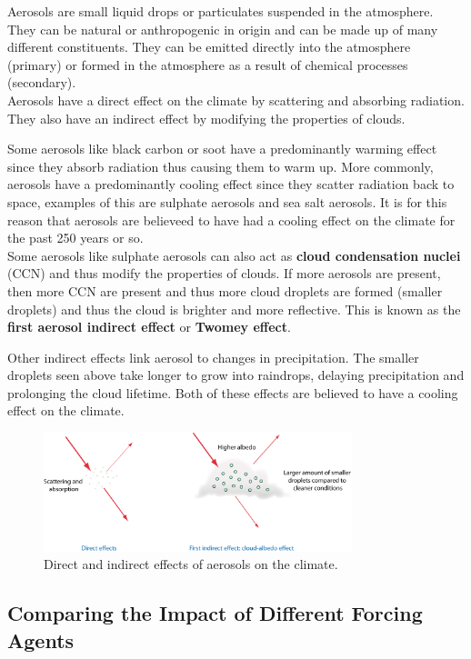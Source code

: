 Aerosols are small liquid drops or particulates suspended in the atmosphere. They can be natural or anthropogenic in
origin and can be made up of many different constituents. They can be emitted directly into the atmosphere (primary) or
formed in the atmosphere as a result of chemical processes (secondary).\\

Aerosols have a direct effect on the climate by scattering and absorbing radiation. They also have an indirect
effect by modifying the properties of clouds.

Some aerosols like black carbon or soot have a predominantly warming effect since they absorb radiation thus causing
them to warm up. More commonly, aerosols have a predominantly cooling effect since they scatter radiation back to space,
examples of this are sulphate aerosols and sea salt aerosols. It is for this reason that aerosols are believeed to have
had a cooling effect on the climate for the past 250 years or so.\\

Some aerosols like sulphate aerosols can also act as \textbf{cloud condensation nuclei} (CCN) and thus modify the 
properties of clouds. If more aerosols are present, then more CCN are present and thus more cloud droplets are formed
(smaller droplets) and thus the cloud is brighter and more reflective. This is known as the \textbf{first aerosol
indirect effect} or \textbf{Twomey effect}. 

Other indirect effects link aerosol to changes in precipitation. The smaller droplets seen above take longer to grow into
raindrops, delaying precipitation and prolonging the cloud lifetime. Both of these effects are believed to have a
cooling effect on the climate.

\begin{figure}[h]
    \centering
    \includegraphics[width=0.8\textwidth]{figures/aerosol.png}
    \caption{Direct and indirect effects of aerosols on the climate.}
    \label{fig:aerosol}
\end{figure}

\subsection{Comparing the Impact of Different Forcing Agents}
\label{sec:comp-impact-diff}

